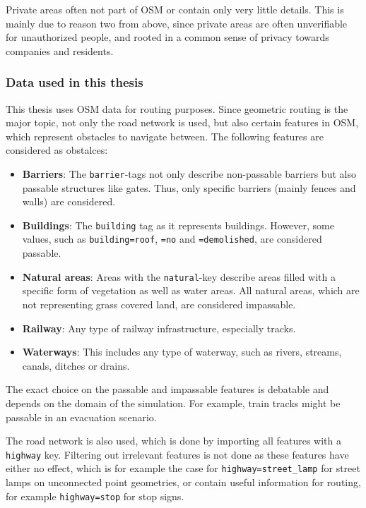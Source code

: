 			Private areas often not part of OSM or contain only very little details.
			This is mainly due to reason two from above, since private areas are often unverifiable for unauthorized people, and rooted in a common sense of privacy towards companies and residents.
			
		\subsubsection{Data used in this thesis}
		
			This thesis uses OSM data for routing purposes.
			Since geometric routing is the major topic, not only the road network is used, but also certain features in OSM, which represent obstacles to navigate between.
			The following features are considered as obstalces:
			\begin{itemize}
				\item \textbf{Barriers}: The \texttt{barrier}-tags not only describe non-passable barriers but also passable structures like gates. Thus, only specific barriers (mainly fences and walls) are considered.
				\item \textbf{Buildings}: The \texttt{building} tag as it represents buildings. However, some values, such as \texttt{building=roof}, \texttt{=no} and \texttt{=demolished}, are considered passable.
				\item \textbf{Natural areas}: Areas with the \texttt{natural}-key describe areas filled with a specific form of vegetation as well as water areas. All natural areas, which are not representing grass covered land, are considered impassable.
				\item \textbf{Railway}: Any type of railway infrastructure, especially tracks.
				\item \textbf{Waterways}: This includes any type of waterway, such as rivers, streams, canals, ditches or drains.
			\end{itemize}
			The exact choice on the passable and impassable features is debatable and depends on the domain of the simulation.
			For example, train tracks might be passable in an evacuation scenario.
			
			The road network is also used, which is done by importing all features with a \texttt{highway} key.
			Filtering out irrelevant features is not done as these features have either no effect, which is for example the case for \texttt{highway=street\_lamp} for street lamps on unconnected point geometries, or contain useful information for routing, for example \texttt{highway=stop} for stop signs.

